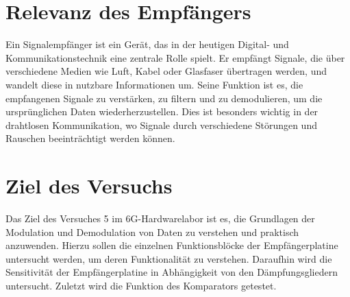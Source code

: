 \section{Relevanz des Empfängers}
    Ein Signalempfänger ist ein Gerät, das in der heutigen Digital- und Kommunikationstechnik eine zentrale Rolle spielt. Er empfängt Signale, die über verschiedene Medien wie Luft, Kabel oder Glasfaser übertragen werden, und wandelt diese in nutzbare Informationen um.
    Seine Funktion ist es, die empfangenen Signale zu verstärken, zu filtern und zu demodulieren, um die ursprünglichen Daten wiederherzustellen. Dies ist besonders wichtig in der drahtlosen Kommunikation, wo Signale durch verschiedene Störungen und Rauschen beeinträchtigt werden können.
\section{Ziel des Versuchs}
    Das Ziel des Versuches 5 im 6G-Hardwarelabor ist es, die Grundlagen der Modulation und Demodulation von Daten zu verstehen und praktisch anzuwenden. Hierzu sollen die einzelnen Funktionsblöcke der Empfängerplatine untersucht werden, um deren Funktionalität zu verstehen. Daraufhin wird die Sensitivität der Empfängerplatine in Abhängigkeit von den Dämpfungsgliedern untersucht. Zuletzt wird die Funktion des Komparators getestet.
\clearpage